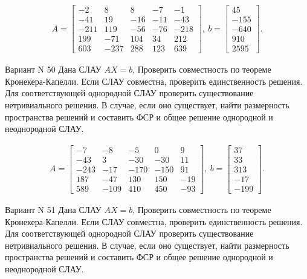 \documentclass[11pt]{report}
\begin{document}
\begin{align*}
 A = \left[\begin{matrix}-2 & 8 & 8 & -7 & -1\\-41 & 19 & -16 & -11 & -43\\-211 & 119 & -56 & -76 & -218\\199 & -71 & 104 & 34 & 212\\603 & -237 & 288 & 123 & 639\end{matrix}\right],
\ b = \left[\begin{matrix}45\\-155\\-640\\910\\2595\end{matrix}\right]. 
 \end{align*}

Вариант N 50
Дана СЛАУ $AX = b$,
Проверить совместность по теореме Кронекера-Капелли. Если СЛАУ совместна, проверить единственность решения.
Для соответствующей однородной СЛАУ проверить существование нетривиального решения. В случае, если оно существует,
найти размерность пространства решений и составить ФСР и общее решение однородной  и неоднородной СЛАУ.


\begin{align*}
 A = \left[\begin{matrix}-7 & -8 & -5 & 0 & 9\\-43 & 3 & -30 & -30 & 11\\-243 & -17 & -170 & -150 & 91\\187 & -47 & 130 & 150 & -19\\589 & -109 & 410 & 450 & -93\end{matrix}\right],
\ b = \left[\begin{matrix}37\\33\\313\\-17\\-199\end{matrix}\right]. 
 \end{align*}

Вариант N 51
Дана СЛАУ $AX = b$,
Проверить совместность по теореме Кронекера-Капелли. Если СЛАУ совместна, проверить единственность решения.
Для соответствующей однородной СЛАУ проверить существование нетривиального решения. В случае, если оно существует,
найти размерность пространства решений и составить ФСР и общее решение однородной  и неоднородной СЛАУ.
\end{document}
